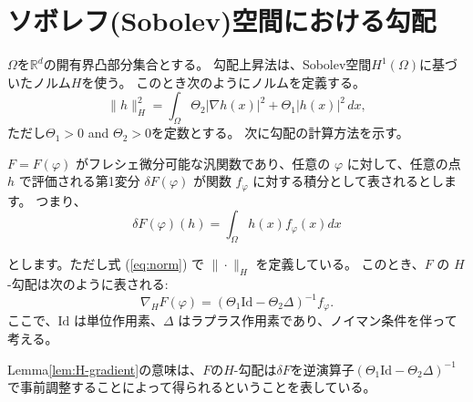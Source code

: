 \section{ソボレフ(Sobolev)空間における勾配}
\label{sect:ソボレフ(Sobolev)空間における勾配}
$\Omega$を$\mathbb{R}^d$の開有界凸部分集合とする。
勾配上昇法は、Sobolev空間$H^1(\Omega)$に基づいたノルム$H$を使う。
このとき次のようにノルムを定義する。
\begin{equation}
    \label{eq:norm}
    \|h\|_H^2 = \int_{\Omega} \Theta_2 |\nabla h(x)|^2 + \Theta_1 |h(x)|^2 \, dx,
\end{equation}
ただし$\Theta_1 > 0$ and $\Theta_2 > 0$を定数とする。
次に勾配の計算方法を示す。
\begin{lem}[\cite{MR4238775}]
    \label{lem:H-gradient}
    $F = F(\varphi)$ がフレシェ微分可能な汎関数であり、任意の $\varphi$ に対して、任意の点 $h$ で評価される第1変分 $\delta F(\varphi)$ が関数 $f_{\varphi}$ に対する積分として表されるとします。
    つまり、
    \[
        \delta F(\varphi)(h) = \int_\Omega h(x) f_{\varphi}(x) dx
    \]

とします。ただし式 (\ref{eq:norm}) で $\| \cdot \|_H$ を定義している。
このとき、$F$ の $H$-勾配は次のように表される$:$
\[
    \nabla_H F(\varphi) = (\Theta_1 \mathrm{Id} - \Theta_2 \Delta)^{-1} f_{\varphi}.
\]
ここで、$\mathrm{Id}$ は単位作用素、$\Delta$ はラプラス作用素であり、ノイマン条件を伴って考える。
\end{lem}

Lemma\ref{lem:H-gradient}の意味は、$F$の$H$-勾配は$\delta F$を逆演算子$(\Theta_1 \text{Id} - \Theta_2\Delta)^{-1}$で事前調整することによって得られるということを表している。

